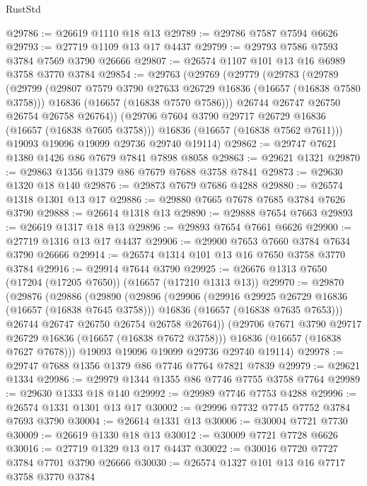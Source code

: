 \begin{lexlean}{RustStd}
\begin{coremodule}
@29786 := @26619 @1110 @18 @13
@29789 := @29786 @7587 @7594 @6626
@29793 := @27719 @1109 @13 @17 @4437
@29799 := @29793 @7586 @7593 @3784 @7569 @3790 @26666
@29807 := @26574 @1107 @101 @13 @16 @6989 @3758 @3770 @3784
@29854 := @29763
    (@29769
      (@29779
        (@29783
          (@29789
            (@29799
              (@29807 @7579 @3790 @27633 @26729 @16836 (@16657 (@16838 @7580 @3758)))
              @16836
              (@16657 (@16838 @7570 @7586)))
            @26744
            @26747
            @26750
            @26754
            @26758
            @26764))
        (@29706 @7604 @3790 @29717 @26729 @16836 (@16657 (@16838 @7605 @3758)))
        @16836
        (@16657 (@16838 @7562 @7611)))
      @19093
      @19096
      @19099
      @29736
      @29740
      @19114)
@29862 := @29747 @7621 @1380 @1426 @86 @7679 @7841 @7898 @8058
@29863 := @29621 @1321
@29870 := @29863 @1356 @1379 @86 @7679 @7688 @3758 @7841
@29873 := @29630 @1320 @18 @140
@29876 := @29873 @7679 @7686 @4288
@29880 := @26574 @1318 @1301 @13 @17
@29886 := @29880 @7665 @7678 @7685 @3784 @7626 @3790
@29888 := @26614 @1318 @13
@29890 := @29888 @7654 @7663
@29893 := @26619 @1317 @18 @13
@29896 := @29893 @7654 @7661 @6626
@29900 := @27719 @1316 @13 @17 @4437
@29906 := @29900 @7653 @7660 @3784 @7634 @3790 @26666
@29914 := @26574 @1314 @101 @13 @16 @7650 @3758 @3770 @3784
@29916 := @29914 @7644 @3790
@29925 := @26676 @1313 @7650 (@17204 (@17205 @7650)) (@16657 (@17210 @1313 @13))
@29970 := @29870
    (@29876
      (@29886
        (@29890
          (@29896
            (@29906
              (@29916 @29925 @26729 @16836 (@16657 (@16838 @7645 @3758)))
              @16836
              (@16657 (@16838 @7635 @7653)))
            @26744
            @26747
            @26750
            @26754
            @26758
            @26764))
        (@29706 @7671 @3790 @29717 @26729 @16836 (@16657 (@16838 @7672 @3758)))
        @16836
        (@16657 (@16838 @7627 @7678)))
      @19093
      @19096
      @19099
      @29736
      @29740
      @19114)
@29978 := @29747 @7688 @1356 @1379 @86 @7746 @7764 @7821 @7839
@29979 := @29621 @1334
@29986 := @29979 @1344 @1355 @86 @7746 @7755 @3758 @7764
@29989 := @29630 @1333 @18 @140
@29992 := @29989 @7746 @7753 @4288
@29996 := @26574 @1331 @1301 @13 @17
@30002 := @29996 @7732 @7745 @7752 @3784 @7693 @3790
@30004 := @26614 @1331 @13
@30006 := @30004 @7721 @7730
@30009 := @26619 @1330 @18 @13
@30012 := @30009 @7721 @7728 @6626
@30016 := @27719 @1329 @13 @17 @4437
@30022 := @30016 @7720 @7727 @3784 @7701 @3790 @26666
@30030 := @26574 @1327 @101 @13 @16 @7717 @3758 @3770 @3784

\end{coremodule}
\end{lexlean}
